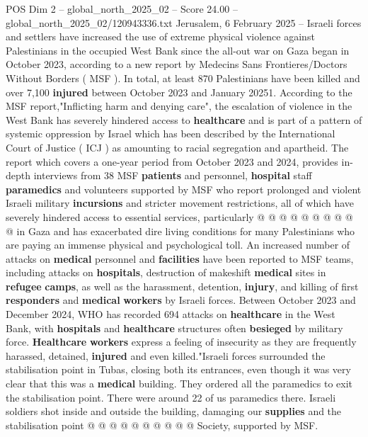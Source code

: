 \begin{textsample}{POS Dim 2 – global\_north\_2025\_02 – Score 24.00 – global\_north\_2025\_02/120943336.txt}  \label{ex:f2_pos_434}
Jerusalem, 6 February 2025 -- Israeli forces and settlers have increased the use of extreme physical violence against Palestinians in the occupied West Bank since the all-out war on Gaza began in October 2023, according to a new report by Medecins Sans Frontieres/Doctors Without Borders ( MSF ).
In total, at least 870 Palestinians have been killed and over 7,100 \textbf{injured} between October 2023 and January 20251.
According to the MSF report,"Inflicting harm and denying care", the escalation of violence in the West Bank has severely hindered access to \textbf{healthcare} and is part of a pattern of systemic oppression by Israel which has been described by the International Court of Justice ( ICJ ) as amounting to racial segregation and apartheid.
The report which covers a one-year period from October 2023 and 2024, provides in-depth interviews from 38 MSF \textbf{patients} and personnel, \textbf{hospital} staff \textbf{paramedics} and volunteers supported by MSF who report prolonged and violent Israeli military \textbf{incursions} and stricter movement restrictions, all of which have severely hindered access to essential services, particularly @ @ @ @ @ @ @ @ @ @ in Gaza and has exacerbated dire living conditions for many Palestinians who are paying an immense physical and psychological toll.
An increased number of attacks on \textbf{medical} personnel and \textbf{facilities} have been reported to MSF teams, including attacks on \textbf{hospitals}, destruction of makeshift \textbf{medical} sites in \textbf{refugee} \textbf{camps}, as well as the harassment, detention, \textbf{injury}, and killing of first \textbf{responders} and \textbf{medical} \textbf{workers} by Israeli forces.
Between October 2023 and December 2024, WHO has recorded 694 attacks on \textbf{healthcare} in the West Bank, with \textbf{hospitals} and \textbf{healthcare} structures often \textbf{besieged} by military force. \textbf{Healthcare} \textbf{workers} express a feeling of insecurity as they are frequently harassed, detained, \textbf{injured} and even killed."Israeli forces surrounded the stabilisation point in Tubas, closing both its entrances, even though it was very clear that this was a \textbf{medical} building.
They ordered all the paramedics to exit the stabilisation point.
There were around 22 of us paramedics there.
Israeli soldiers shot inside and outside the building, damaging our \textbf{supplies} and the stabilisation point @ @ @ @ @ @ @ @ @ @ Society, supported by MSF.

\end{textsample}
